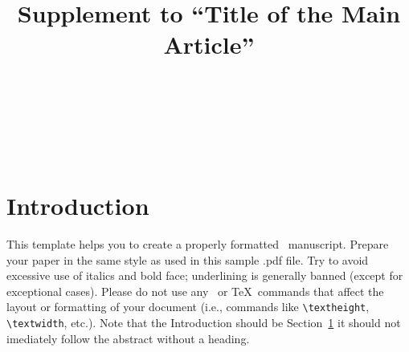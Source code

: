 \documentclass[ecta,nameyear,final,supplement]{econsocart}
\theoremstyle{plain}
\theoremstyle{definition}
\begin{document}
\begin{frontmatter}

\title{Supplement to ``Title of the Main Article''}

\begin{aug}
%
%
%
\author[add1,add11]{~}
\author[add2]{~}
\author[add2]{~}
\address[add1]{%
,
}

\address[add11]{%
,
}

\address[add2]{%
,
}
\end{aug}


\end{frontmatter}

\section{Introduction}\label{s1}

This template helps you to create a properly formatted \LaTeXe\ manuscript.
Prepare your paper in the same style as used in this sample .pdf file.
Try to avoid excessive use of italics and bold face; underlining is generally banned (except for exceptional cases). Please do not use any \LaTeXe\ or \TeX\ commands that affect the layout or formatting of your document (i.e., commands like \verb|\textheight|, \verb|\textwidth|, etc.). Note that the Introduction should be Section~\ref{s1} it should not imediately follow the abstract without a heading.
\end{document}
